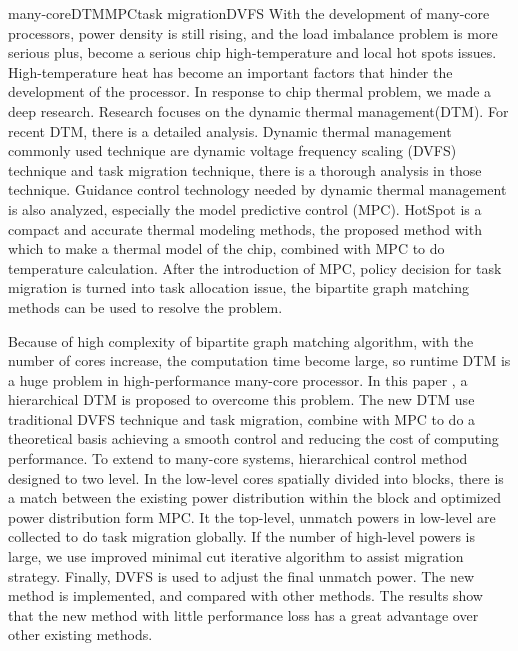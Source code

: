 
\begin{Eabstract}{many-core}{DTM}{MPC}{task migration}{DVFS}
 With the development of many-core processors, power density is still rising,
 and the load imbalance problem is more serious plus, become a serious chip high-temperature and local hot spots issues. 
 High-temperature heat has become an important factors that hinder the development of the processor. 
 In response to chip thermal problem, we made a deep research.
 Research focuses on the dynamic thermal management(DTM). 
 For recent DTM, there is a detailed analysis. 
 Dynamic thermal management commonly used technique are dynamic voltage frequency scaling (DVFS) technique and task migration technique,
 there is a thorough analysis in those technique. Guidance control technology needed by dynamic thermal management is also analyzed, 
 especially the model predictive control (MPC). HotSpot is a compact and  accurate thermal modeling methods, 
 the proposed method with which to make a thermal model of the chip, 
 combined with MPC to do temperature calculation. 
 After the introduction of MPC, policy decision for task migration is turned into task allocation issue, 
 the bipartite graph matching methods can be used to resolve the problem.
 
 Because of high complexity of bipartite graph matching algorithm, 
 with the number of cores increase, the computation time become large, 
 so runtime DTM is a huge problem in high-performance many-core processor. 
 In this paper , a hierarchical DTM is proposed to overcome this problem. 
 The new DTM  use traditional DVFS technique and task migration, 
 combine with MPC to do a theoretical basis  achieving a smooth  control and reducing the cost of computing performance.
 To extend to many-core systems, hierarchical control method designed to two level. 
 In the low-level cores spatially divided into blocks, 
 there is a match between the existing power distribution within the block and optimized power distribution form MPC. 
 It the top-level, unmatch powers in low-level are collected to do task migration globally. 
 If the number of high-level powers is large, we use improved minimal cut iterative algorithm to assist migration strategy. 
 Finally, DVFS  is used to adjust the final unmatch power. The new method is  implemented, 
 and compared with other methods. 
 The results show that the new method with little performance loss has a great advantage over other existing methods.
\end{Eabstract}
